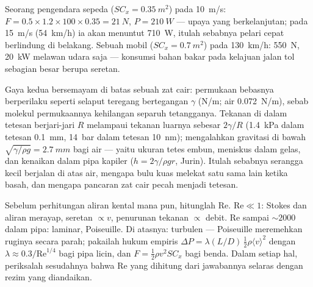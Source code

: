 \begin{example}\label{ex:b2:viscous-flows:cyclist}
Seorang pengendara sepeda ($SC_x = \qty{0.35}{m^2}$) pada \qty{10}{m/s}: $F = 0.5 \times 1.2 \times 100
\times 0.35 = \qty{21}{N}$, $P = \qty{210}{W}$ --- upaya yang berkelanjutan; pada \qty{15}{m/s}
(\qty{54}{km/h}) ia akan menuntut \qty{710}{W}, itulah sebabnya pelari cepat berlindung di belakang.
Sebuah mobil ($SC_x = \qty{0.7}{m^2}$) pada \qty{130}{km/h}: \qty{550}{N}, \qty{20}{kW} melawan
udara saja --- konsumsi bahan bakar pada kelajuan jalan tol sebagian besar berupa seretan.
\end{example}

\begin{remark}\label{rem:b2:viscous-flows:capillarity}
Gaya kedua bersemayam di batas sebuah zat cair: permukaan bebasnya
berperilaku seperti selaput teregang bertegangan $\gamma$ (\unit{N/m}; air
\qty{0.072}{N/m}), sebab molekul permukaannya kehilangan separuh tetangganya.
Tekanan di dalam tetesan berjari-jari $R$ melampaui tekanan luarnya sebesar
\emph{} $2\gamma/R$ (\qty{1.4}{kPa} dalam tetesan \qty{0.1}{mm},
\qty{14}{bar} dalam tetesan \qty{10}{nm});  mengalahkan gravitasi di bawah
\emph{} $\sqrt{\gamma/\rho g} = \qty{2.7}{mm}$ bagi air ---
yaitu ukuran tetes embun, meniskus dalam gelas, dan kenaikan dalam
pipa kapiler ($h = 2\gamma/\rho gr$, Jurin). Itulah sebabnya serangga kecil berjalan
di atas air, mengapa bulu kuas melekat satu sama lain ketika basah, dan mengapa
pancaran zat cair pecah menjadi tetesan.
\end{remark}

\begin{method}\label{met:b2:viscous-flows:regime}
Sebelum perhitungan aliran kental mana pun, hitunglah $\mathrm{Re}$. $\mathrm{Re} \ll 1$:
Stokes dan aliran merayap, seretan $\propto v$, penurunan tekanan $\propto$
debit. $\mathrm{Re}$ sampai $\sim\!2000$ dalam pipa: laminar, Poiseuille. Di atasnya:
turbulen --- Poiseuille meremehkan ruginya secara parah; pakailah
hukum empiris $\Delta P = \lambda(L/D)\,\tfrac12\rho\langle v\rangle^2$ dengan $\lambda
\approx 0.3/\mathrm{Re}^{1/4}$ bagi pipa licin, dan $F = \tfrac12\rho v^2SC_x$ bagi
benda. Dalam setiap hal, periksalah sesudahnya bahwa $\mathrm{Re}$ yang dihitung
dari jawabannya selaras dengan rezim yang diandaikan.
\end{method}

